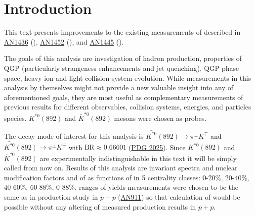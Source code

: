\section{Introduction}

This text presents improvements to the existing measurements of \kstar described in \href{https://phenix-intra.sdcc.bnl.gov/phenix/WWW/p/draft/vborisov/kstar_production_in_HeAu200_1.pdf}{AN1436} (\HeAu), \href{https://phenix-intra.sdcc.bnl.gov/phenix/WWW/p/draft/vborisov/K_production_in_pAl200_v2.pdf}{AN1452} (\pAl), and \href{https://phenix-intra.sdcc.bnl.gov/phenix/WWW/p/draft/vborisov/kstar_production_in_pAu200.pdf}{AN1445} (\pAu).

The goals of this analysis are investigation of hadron production, properties of QGP (particularly strangeness enhancements and jet quenching), QGP phase space, heavy-ion and light collision system evolution.
While measurements in this analysis by themselves might not provide a new valuable insight into any of aforementioned goals, they are most useful as complementary measurements of previous results for different observables, collision systems, energies, and particles species.
$K^{*0}(892)$ and $\bar{K}^{*0}(892)$ mesons were chosen as probes. 

The decay mode of interest for this analysis is $\bar{K^{*0}}(892) \rightarrow \pi^\pm K^\mp$ and $\bar{K^{*0}}(892) \rightarrow \pi^\pm K^\mp$ with $\text{BR} \approx 0.66601$ (\href{https://pdg.lbl.gov/2025/web/viewer.html?file=../listings/rpp2025-list-K-star-892.pdf}{PDG 2025}). 
Since $K^{*0}(892)$ and $\bar{K}^{*0}(892)$ are experimentally indistinguishable in this text it will be simply called \kstar from now on. Results of this analysis are invariant \pT spectra and nuclear modification factors \rab and \rcp of \kstar as functions of \pT in 5 centrality classes: 0-20\%, 20-40\%, 40-60\%, 60-88\%, 0-88\%. 
\pT ranges of yields measurements were chosen to be the same as in \kstar production study in $p+p$ (\href{https://phenix-intra.sdcc.bnl.gov/phenix/WWW/p/draft/pshukla/AnakstarNew/anakstar5.pdf}{AN911}) so that calculation of \rab would be possible without any altering of measured \kstar production results in $p+p$.
